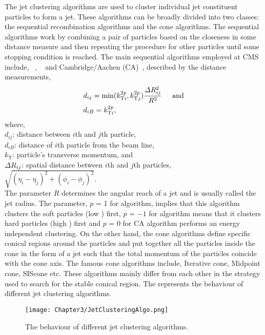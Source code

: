 The jet clustering algorithms are used to cluster individual jet constituent particles to form a jet. These algorithms can be broadly divided into
two classes: the sequential recombination algorithms and the cone algorithms. The sequential algorithms work by combining a pair of particles based on the
closeness in some distance measure and then repeating the procedure for other particles until some stopping condition is reached. The main sequential algorithms
employed at CMS include, \kt~\cite{Catani:246812}, \antikt~\cite{Cacciari:2008gp} and Cambridge$/$Aachen (CA)~\cite{CMS-PAS-JME-09-001, Dokshitzer:1997in},
described by the distance measurements,
\begin{equation}
  \begin{split}
    & d_{ij} = \textrm{min}(k^{2p}_{\mathrm{T}i}, k^{2p}_{\mathrm{T}j}) \frac{\Delta{R}^{2}_{ij}}{R^{2}} \hspace{0.2in} \textrm{and}\\
    & d_{iB} = k^{2p}_{\mathrm{T}i},
  \end{split}   
\end{equation}
where, \\
$d_{ij}$: distance between $i$th and $j$th particle, \\
$d_{iB}$: distance of $i$th particle from the beam line, \\
$k_{\mathrm{T}}$: particle's transverse momentum, and \\
$\Delta{R}_{ij}$: spatial distance between $i$th and $j$th particles, $\sqrt{(\eta_{i} - \eta_{j})^{2} + (\phi_{i} - \phi_{j})^{2}}$. \\
The parameter $R$ determines the angular reach of a jet and is usually called the jet radius. The parameter, $p$ = 1 for \kt algorithm,
implies that this algorithm clusters the soft particles (low \pt) first, $p$ = $-1$ for \antikt algorithm
means that it clusters hard particles (high \pt) first and $p$ = 0 for CA algorithm performs an energy independent clustering. 
On the other hand, the cone algorithms define specific conical regions around the particles and put together all the particles inside the cone in the form of a jet 
such that the total momentum of the particles coincide with the cone axis. The famous cone algorithms include,
Iterative cone, Midpoint cone, SIScone etc. These algorithms mainly differ from each other in the strategy used to search for the stable conical region. 
The \fig{\ref{fig:JetClusterAlgo}} represents the behaviour of different jet clustering algorithms.
\begin{figure}[h]
\begin{center}
\texttt{[image: Chapter3/JetClusteringAlgo.png]}
\caption{The behaviour of different jet clustering algorithms.}
\label{fig:JetClusterAlgo}
\end{center}
\end{figure}

